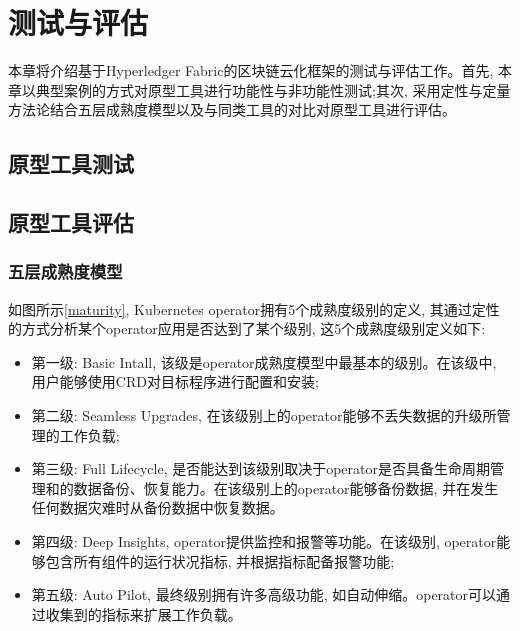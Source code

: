 \chapter{测试与评估}

本章将介绍基于Hyperledger Fabric的区块链云化框架的测试与评估工作。首先, 本章以典型案例的方式对原型工具进行功能性与非功能性测试;其次, 采用定性与定量方法论\cite{tashakkori1998mixed}结合五层成熟度模型以及与同类工具的对比对原型工具进行评估。

\section{原型工具测试}

\section{原型工具评估}

\subsection{五层成熟度模型}

如图所示\ref{maturity}, Kubernetes operator拥有5个成熟度级别的定义\cite{duan2021case}, 其通过定性的方式分析某个operator应用是否达到了某个级别, 这5个成熟度级别定义如下:

\begin{itemize}[itemindent=2em]
    \item 第一级: Basic Intall, 该级是operator成熟度模型中最基本的级别。在该级中, 用户能够使用CRD对目标程序进行配置和安装;

    \item 第二级: Seamless Upgrades, 在该级别上的operator能够不丢失数据的升级所管理的工作负载;

    \item 第三级: Full Lifecycle, 是否能达到该级别取决于operator是否具备生命周期管理和的数据备份、恢复能力。在该级别上的operator能够备份数据, 并在发生任何数据灾难时从备份数据中恢复数据。

    \item 第四级: Deep Insights, operator提供监控和报警等功能。在该级别, operator能够包含所有组件的运行状况指标, 并根据指标配备报警功能;

    \item 第五级: Auto Pilot, 最终级别拥有许多高级功能, 如自动伸缩。operator可以通过收集到的指标来扩展工作负载。

\end{itemize}

